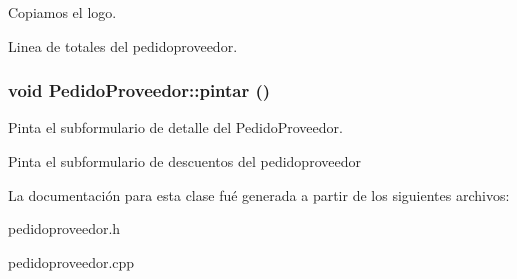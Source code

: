 Copiamos el logo.

Linea de totales del pedidoproveedor. 
\subsubsection{\setlength{\rightskip}{0pt plus 5cm}void Pedido\-Proveedor::pintar ()\hspace{0.3cm}{\tt  [virtual]}}\label{classPedidoProveedor_a23}


Pinta el subformulario de detalle del Pedido\-Proveedor.

Pinta el subformulario de descuentos del pedidoproveedor 

La documentaci\'{o}n para esta clase fu\'{e} generada a partir de los siguientes archivos:\begin{CompactItemize}
\item 
pedidoproveedor.h\item 
pedidoproveedor.cpp\end{CompactItemize}
